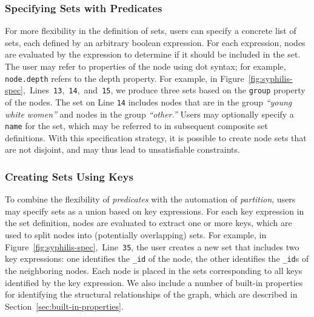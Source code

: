 \subsubsection{Specifying Sets with Predicates}
For more flexibility in the definition of sets, users
can specify a concrete list of sets, each defined by an arbitrary boolean
expression. For each expression, nodes are evaluated by the expression
to determine if it should be included in the set. The user may
refer to properties of the node using dot syntax; for example,
\texttt{node.depth} refers to the depth property. For example, in 
Figure~\ref{fig:syphilis-spec},~Lines~\texttt{13},~\texttt{14},~and~\texttt{15},
we produce three sets based on the \texttt{group} property of the nodes.
The set on Line \texttt{14} includes nodes that are in the group 
\emph{``young white women''} and nodes in the group \emph{``other.''}
Users may optionally 
specify a \texttt{name} for the set, which may be referred to in subsequent
composite set definitions. With this specification strategy, it is possible
to create node sets that are not disjoint, and may thus lead to
unsatisfiable constraints.

\subsubsection{Creating Sets Using Keys}
To combine the flexibility of \emph{predicates} with the automation of 
\emph{partition}, users may specify sets as a union based on key expressions.
For each key expression in the set definition, nodes are evaluated to extract one 
or more keys, which are used to split nodes into (potentially overlapping) 
sets. For example, in Figure~\ref{fig:syphilis-spec},~Line~\texttt{35}, the 
user creates a new set that includes two key expressions: one identifies
the \texttt{\_id} of the node, the other identifies the \texttt{\_id}s of
the neighboring nodes. Each node is placed in the sets corresponding to
all keys identified by the key expression. We also include a number of 
built-in properties for identifying the structural relationships of the 
graph, which are described in Section~\ref{sec:built-in-properties}.

